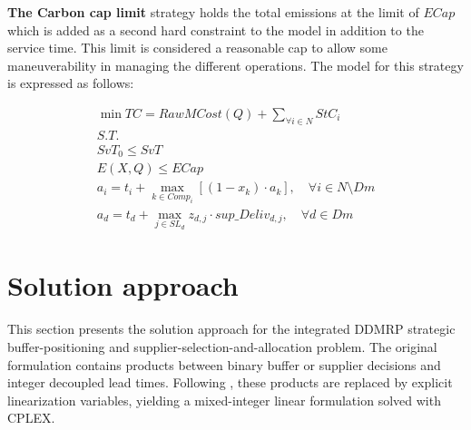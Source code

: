 \documentclass[preprint,12pt,authoryear]{elsarticle}
\begin{document}
\textbf{The Carbon cap limit} strategy holds the total emissions at the limit of $ECap$ which is added as a second hard constraint to the model in addition to the service time. This limit is considered a reasonable cap to allow some maneuverability in managing the different operations. The model for this strategy is expressed as follows:

\begin{gather}
    \min TC = RawMCost(Q) + \sum_{\forall i\in N} StC_{i}\\
    \nonumber S.T.\\
    \nonumber SvT_{0} \leq SvT\\
    \nonumber E(X,Q) \leq ECap\\
    \nonumber a_{i} = t_{i} + \max_{k\in Comp_{i}}[(1-x_{k})\cdot a_{k}],\quad \forall i \in N\setminus Dm \\
    \nonumber a_{d} = t_{d} + \max_{j\in SL_{d}} z_{d,j}\cdot sup\_Deliv_{d,j},\quad \forall d \in Dm
\end{gather}
\section{Solution approach}
This section presents the solution approach for the integrated DDMRP strategic buffer-positioning and supplier-selection-and-allocation problem. The original formulation contains products between binary buffer or supplier decisions and integer decoupled lead times. Following \cite{achergui2}, these products are replaced by explicit linearization variables, yielding a mixed-integer linear formulation solved with CPLEX.
\end{document}
